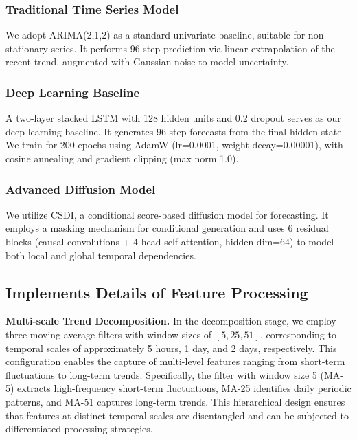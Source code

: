 \subsubsection{Traditional Time Series Model}
We adopt ARIMA(2,1,2) as a standard univariate baseline, suitable for non-stationary series. It performs 96-step prediction via linear extrapolation of the recent trend, augmented with Gaussian noise to model uncertainty.

\subsubsection{Deep Learning Baseline}
A two-layer stacked LSTM with 128 hidden units and 0.2 dropout serves as our deep learning baseline. It generates 96-step forecasts from the final hidden state. We train for 200 epochs using AdamW (lr=0.0001, weight decay=0.00001), with cosine annealing and gradient clipping (max norm 1.0).

\subsubsection{Advanced Diffusion Model}
We utilize CSDI, a conditional score-based diffusion model for forecasting. It employs a masking mechanism for conditional generation and uses 6 residual blocks (causal convolutions + 4-head self-attention, hidden dim=64) to model both local and global temporal dependencies.

\subsection{Implements Details of Feature Processing}
\textbf{Multi-scale Trend Decomposition.} 
In the decomposition stage, we employ three moving average filters with window sizes of $[5, 25, 51]$, corresponding to temporal scales of approximately 5 hours, 1 day, and 2 days, respectively. This configuration enables the capture of multi-level features ranging from short-term fluctuations to long-term trends. Specifically, the filter with window size 5 (MA-5) extracts high-frequency short-term fluctuations, MA-25 identifies daily periodic patterns, and MA-51 captures long-term trends. This hierarchical design ensures that features at distinct temporal scales are disentangled and can be subjected to differentiated processing strategies.

